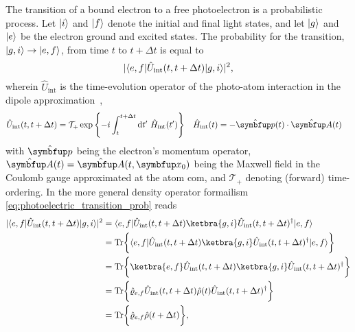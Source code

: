 The transition of a bound electron to a free photoelectron is a probabilistic process.
Let $\lvert i\rangle$ and $\lvert f\rangle$ denote the initial and final light states, and let $\lvert g\rangle$ and $\lvert e\rangle$ be the electron ground and excited states.
The probability for the transition, $\lvert g,i\rangle\to\lvert e,f\rangle$, from time $t$ to $t+\Delta t$ is equal to
\begin{equation}
	\lvert
		\langle e,f\rvert
		\hat{U}_\text{int}(t,t+\Delta t)
		\lvert g,i\rangle
	\rvert^2
	\label{eq:photoelectric_transition_prob}
	,
\end{equation}
wherein $\hat{U}_\text{int}$ is the time-evolution operator of the photo-atom interaction in the dipole approximation~\cite[p.~689]{Mandel1995},
\begin{align}
	\hat{U}_\text{int}(t,t+\Delta t)
	&=
	\mathcal{T}_+
	\exp\left\{
		-i
		\int_t^{t+\Delta t}
		\dd{t^\prime}
		\hat{H}_\text{int}(t^\prime)
	\right\}
	&
	\hat{H}_\text{int}(t)
	&=
	-
	\hat{\vb{p}}(t)
	\vdot
	\hat{\vb{A}}(t)
	\label{eq:photoelectric_time_evolution_operator}
\end{align}
with $\vu{p}$ being the electron's momentum operator, $\vu{A}(t)=\vu{A}(t,\vb{x}_0)$ being the Maxwell field in the Coulomb gauge approximated at the atom \gls{com}, and $\mathcal{T}_+$ denoting (forward) time-ordering.
In the more general density operator formailism \cref{eq:photoelectric_transition_prob} reads~\cite[p.~686]{Mandel1995}
\begin{equation}
	\begin{split}
		\abs{
			\bra{e,f}
			\hat{U}_\text{int}(t,t+\Delta t)
			\ket{g,i}
		}^2
		&=
		\bra{e,f}
		\hat{U}_\text{int}(t,t+\Delta t)
		\ketbra{g,i}
		\hat{U}_\text{int}(t,t+\Delta t)^\dagger
		\ket{e,f}
		\\
		&=
		\trace\biggl\{
			\bra{e,f}
			\hat{U}_\text{int}(t,t+\Delta t)
			\ketbra{g,i}
			\hat{U}_\text{int}(t,t+\Delta t)^\dagger
			\ket{e,f}
		\biggr\}
		\\
		&=
		\trace\biggl\{
			\ketbra{e,f}
			\hat{U}_\text{int}(t,t+\Delta t)
			\ketbra{g,i}
			\hat{U}_\text{int}(t,t+\Delta t)^\dagger
		\biggr\}
		\\
		&=
		\trace\biggl\{
			\hat\varrho_{e,f}
			\hat{U}_\text{int}(t,t+\Delta t)
			\hat\rho(t)
			\hat{U}_\text{int}(t,t+\Delta t)^\dagger
		\biggr\}
		\\
		&=
		\trace\biggl\{
			\hat\varrho_{e,f}
			\hat\rho(t+\Delta t)
		\biggr\}
		,
	\end{split}
	\label{eq:photoelectric_transition_prob_density}
\end{equation}
